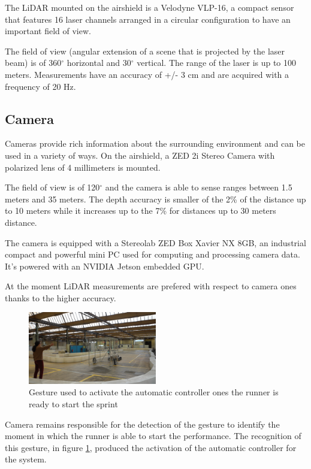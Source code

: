 \documentclass[a4paper,12pt,oneside]{book}
\begin{document}
The LiDAR mounted on the airshield is a Velodyne VLP-16, a compact sensor that features 16 laser channels arranged in a circular configuration to have an important field of view.

The field of view (angular extension of a scene that is projected by the laser beam) is of 360$^\circ$ horizontal and 30$^\circ$ vertical.
The range of the laser is up to 100 meters. 
Measurements have an accuracy of +/- 3 cm and are acquired with a frequency of 20 Hz.

\subsection*{Camera}
Cameras provide rich information about the surrounding environment and can be used in a variety of ways.
On the airshield, a ZED 2i Stereo Camera with polarized lens of 4 millimeters is mounted.

The field of view is of 120$^\circ$ and the camera is able to sense ranges between 1.5 meters and 35 meters. 
The depth accuracy is smaller of the 2\% of the distance up to 10 meters while it increases up to the 7\% for distances up to 30 meters distance.

The camera is equipped with a Stereolab ZED Box Xavier NX 8GB, an industrial compact and powerful mini PC used for computing and processing camera data.
It's powered with an NVIDIA Jetson embedded GPU.

At the moment LiDAR measurements are prefered with respect to camera ones thanks to the higher accuracy.

\begin{figure}[h!]
	\centering
	\includegraphics[width=0.5\textwidth]{Gesture.png}
\caption{Gesture used to activate the automatic controller ones the runner is ready to start the sprint}
\label{gesture}
\end{figure}

Camera remains responsible for the detection of the gesture to identify the moment in which the runner is able to start the performance. 
The recognition of this gesture, in figure \ref{gesture}, produced the activation of the automatic controller for the system.
\end{document}
